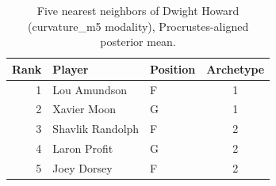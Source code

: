 \begin{table}[htbp]
  \centering\small
  \begin{tabular}{rllc}
    \toprule
    Rank & Player & Position & Archetype \\
    \midrule
    1 & Lou Amundson & F & 1 \\
    2 & Xavier Moon & G & 1 \\
    3 & Shavlik Randolph & F & 2 \\
    4 & Laron Profit & G & 2 \\
    5 & Joey Dorsey & F & 2 \\
    \bottomrule
  \end{tabular}
  \caption{Five nearest neighbors of Dwight Howard (curvature_m5 modality), Procrustes-aligned posterior mean.}
  \label{tab:Dwight_Howard_neighbors_curvature_m5}
\end{table}

